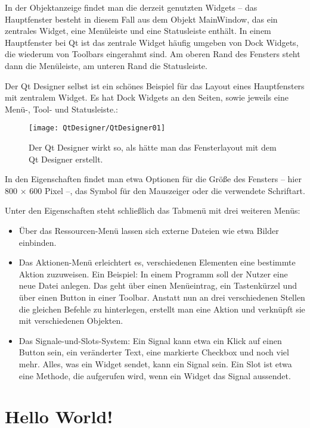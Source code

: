 In der Objektanzeige findet man die derzeit genutzten Widgets – das Hauptfenster besteht in diesem Fall aus dem Objekt MainWindow, das ein zentrales Widget, eine Menüleiste und eine Statusleiste enthält. In einem Hauptfenster bei Qt ist das zentrale Widget häufig umgeben von Dock Widgets, die wiederum von Toolbars eingerahmt sind. Am oberen Rand des Fensters steht dann die Menüleiste, am unteren Rand die Statusleiste.

Der Qt Designer selbst ist ein schönes Beispiel für das Layout eines Hauptfensters mit zentralem Widget. Es hat Dock Widgets an den Seiten, sowie jeweils eine Menü-, Tool- und Statusleiste.:

\begin{figure}
    \begin{center}
       \texttt{[image: QtDesigner/QtDesigner01]}
       \caption{Der Qt Designer wirkt so, als hätte man das Fensterlayout mit dem Qt Designer erstellt.}
    \end{center}
\end{figure}


In den Eigenschaften findet man etwa Optionen für die Größe des Fensters – hier 800 × 600 Pixel –, das Symbol für den Mauszeiger oder die verwendete Schriftart.

Unter den Eigenschaften steht schließlich das Tabmenü mit drei weiteren Menüs:

\begin{itemize}
  \item Über das Ressourcen-Menü lassen sich externe Dateien wie etwa Bilder einbinden.
  \item Das Aktionen-Menü erleichtert es, verschiedenen Elementen eine bestimmte Aktion zuzuweisen. Ein Beispiel: In einem Programm soll der Nutzer eine neue Datei anlegen. Das geht über einen Menüeintrag, ein Tastenkürzel und über einen Button in einer Toolbar. Anstatt nun an drei verschiedenen Stellen die gleichen Befehle zu hinterlegen, erstellt man eine Aktion und verknüpft sie mit verschiedenen Objekten.
  \item Das Signale-und-Slots-System: Ein Signal kann etwa ein Klick auf einen Button sein, ein veränderter Text, eine markierte Checkbox und noch viel mehr. Alles, was ein Widget sendet, kann ein Signal sein. Ein Slot ist etwa eine Methode, die aufgerufen wird, wenn ein Widget das Signal aussendet.
\end{itemize}

\section{Hello World!}

